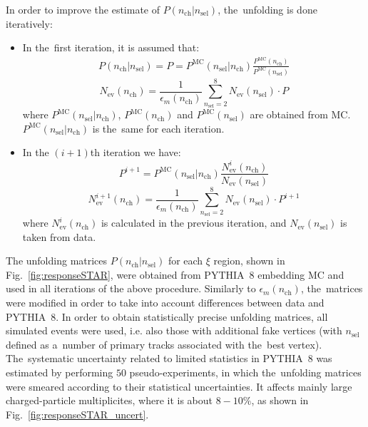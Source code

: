 \noindent 
In order to improve the estimate of $P(n_\textrm{ch}|n_\textrm{sel})$, the~unfolding  is done iteratively:
\begin{itemize}
	\item In the~first iteration, it is assumed that: \\
	\begin{eqnarray}
	P(n_\textrm{ch}|n_\textrm{sel}) = P = P^{\textrm{MC}}(n_\textrm{sel}|n_\textrm{ch})\frac{P^\textrm{MC}(n_\textrm{ch})}{P^\textrm{MC}(n_\textrm{sel})}
	\end{eqnarray}
	\begin{equation}
	N_\textrm{ev}(n_\textrm{ch})=\frac{1}{\epsilon_{m}(n_\textrm{ch})}\sum_{n_\textrm{sel}=2}^{8}N_\textrm{ev}(n_\textrm{sel})\cdot P
	\end{equation}
	where $P^{\textrm{MC}}(n_\textrm{sel}|n_\textrm{ch})$, $P^\textrm{MC}(n_\textrm{ch})$ and $P^\textrm{MC}(n_\textrm{sel})$ are obtained from MC. $P^{\textrm{MC}}(n_\textrm{sel}|n_\textrm{ch})$ is the~same for each iteration.
	
	\item In the $(i+1)$th iteration we have:
	\begin{equation}
	P^{i+1}=P^{\textrm{MC}}(n_\textrm{sel}|n_\textrm{ch})\frac{N_\textrm{ev}^{i}(n_\textrm{ch})}{N_\textrm{ev}(n_\textrm{sel})}
	\end{equation}
	\begin{equation}
	N_\textrm{ev}^{i+1}(n_\textrm{ch})=\frac{1}{\epsilon_{m}(n_\textrm{ch})}\sum_{n_\textrm{sel}=2}^{8}N_\textrm{ev}(n_\textrm{sel})\cdot P^{i+1}
	\end{equation}
	where  $N_\textrm{ev}^i(n_\textrm{ch})$ is calculated in the previous iteration, and $N_\textrm{ev}(n_\textrm{sel})$ is taken from data.
\end{itemize}

The  unfolding matrices $P(n_\textrm{ch}|n_\textrm{sel})$  for each $\xi$ region, shown in Fig.~\ref{fig:responseSTAR}, were obtained from PYTHIA~8 embedding MC and used in all iterations of the above procedure. Similarly to $\epsilon_m(n_\textrm{ch})$, the~matrices were modified in order to take into account differences between data and PYTHIA~8. In order to  obtain statistically precise unfolding matrices,   all simulated events were used, i.e. also those with additional fake vertices (with $n_\textrm{sel}$ defined as a~number of primary tracks associated with the~best vertex).
The~systematic uncertainty related to limited statistics in PYTHIA~8 was estimated by performing $50$ pseudo-experiments, in which the~unfolding matrices were smeared according to their statistical uncertainties.
It affects mainly large charged-particle multiplicites, where it is about $8-10\%$, as shown in Fig.~\ref{fig:responseSTAR_uncert}.


